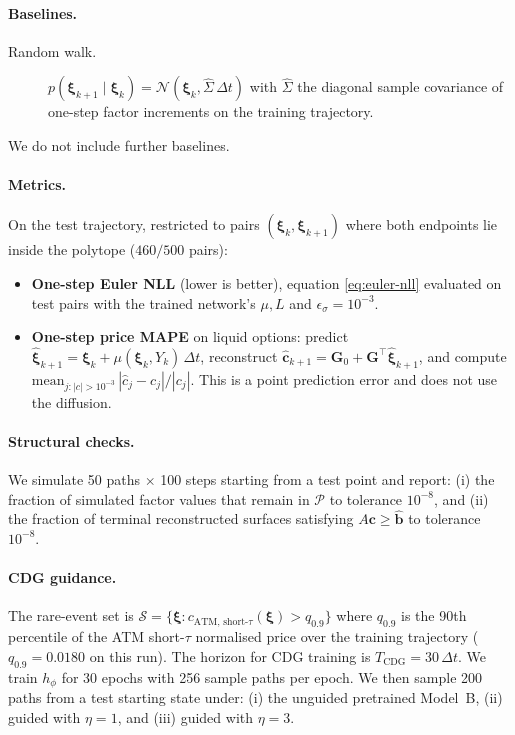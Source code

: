 \documentclass[11pt]{article}
\newcommand{\xib}{\boldsymbol{\xi}}
\newcommand{\1}{\mathbf{1}}
\begin{document}
\paragraph{Baselines.}
\begin{description}
\item[Random walk.] $p(\xib_{k+1} \mid \xib_k) = \mathcal N(\xib_k, \hat\Sigma\, \Delta t)$ with $\hat\Sigma$ the diagonal sample covariance of one-step factor increments on the training trajectory.
\end{description}
We do not include further baselines.

\paragraph{Metrics.}
On the test trajectory, restricted to pairs $(\xib_k, \xib_{k+1})$ where both endpoints lie inside the polytope ($460/500$ pairs):
\begin{itemize}
\item \textbf{One-step Euler NLL} (lower is better), equation \eqref{eq:euler-nll} evaluated on test pairs with the trained network's $\mu, L$ and $\epsilon_\sigma = 10^{-3}$.
\item \textbf{One-step price MAPE} on liquid options: predict $\hat{\xib}_{k+1} = \xib_k + \mu(\xib_k, Y_k)\,\Delta t$, reconstruct $\hat{\mathbf c}_{k+1} = \mathbf G_0 + \mathbf G^\top \hat{\xib}_{k+1}$, and compute $\mathrm{mean}_{j : |c| > 10^{-3}}\, |\hat c_j - c_j|/|c_j|$. This is a point prediction error and does not use the diffusion.
\end{itemize}

\paragraph{Structural checks.}
We simulate 50 paths $\times$ 100 steps starting from a test point and report: (i) the fraction of simulated factor values that remain in $\mathcal P$ to tolerance $10^{-8}$, and (ii) the fraction of terminal reconstructed surfaces satisfying $A \mathbf c \ge \mathbf{\hat b}$ to tolerance $10^{-8}$.

\paragraph{CDG guidance.}
The rare-event set is $\mathcal S = \{\xib : c_{\text{ATM, short-}\tau}(\xib) > q_{0.9}\}$ where $q_{0.9}$ is the 90th percentile of the ATM short-$\tau$ normalised price over the training trajectory ($q_{0.9} = 0.0180$ on this run). The horizon for CDG training is $T_{\text{CDG}} = 30\,\Delta t$. We train $h_\phi$ for 30 epochs with 256 sample paths per epoch. We then sample 200 paths from a test starting state under: (i) the unguided pretrained Model~B, (ii) guided with $\eta = 1$, and (iii) guided with $\eta = 3$.
\end{document}
